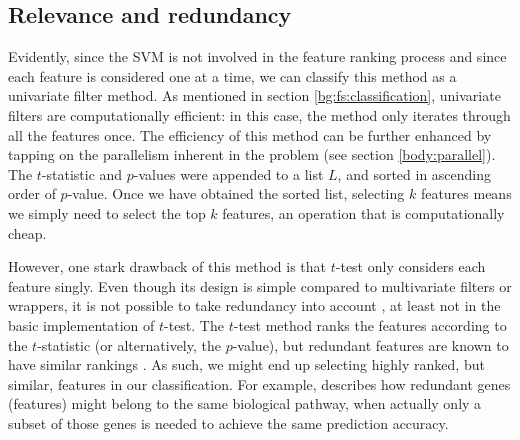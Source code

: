 \documentclass[12pt, twoside, a4paper]{report}
\begin{document}
\subsection{Relevance and redundancy} \label{t_test:redundancy}

Evidently, since the SVM is not involved in the feature ranking process and since each feature is considered one at a time, we can classify this method as a univariate filter method. As mentioned in section \ref{bg:fs:classification}, univariate filters are computationally efficient: in this case, the method only iterates through all the features once. The efficiency of this method can be further enhanced by tapping on the parallelism inherent in the problem (see section \ref{body:parallel}). The $t$-statistic and $p$-values were appended to a list $L$, and sorted in ascending order of $p$-value. Once we have obtained the sorted list, selecting $k$ features means we simply need to select the top $k$ features, an operation that is computationally cheap.

However, one stark drawback of this method is that $t$-test only considers each feature singly. Even though its design is simple compared to multivariate filters or wrappers, it is not possible to take redundancy into account \cite{RefWorks:217}, at least not in the basic implementation of $t$-test. The $t$-test method ranks the features according to the $t$-statistic (or alternatively, the $p$-value), but redundant features are known to have similar rankings \cite{RefWorks:163}. As such, we might end up selecting highly ranked, but similar, features in our classification. For example, \cite{RefWorks:220} describes how redundant genes (features) might belong to the same biological pathway, when actually only a subset of those genes is needed to achieve the same prediction accuracy.

\end{document}
